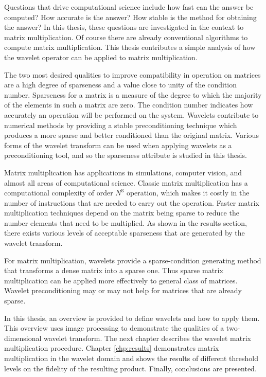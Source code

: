 Questions that drive computational science include how
fast can the answer be computed?  How accurate is the answer?  How
stable is the method for obtaining the answer?  In this thesis, these
questions are investigated in the context to matrix multiplication. Of course there are already
conventional algorithms to compute matrix multiplication. This thesis
contributes a simple analysis of how the wavelet operator can be applied
to matrix multiplication.

The two most desired qualities to improve compatibility in operation on matrices are a high degree of
sparseness and a value close to unity of the condition number. Sparseness for a matrix is a measure of the degree to which %
the majority of the elements in such a matrix are zero.  The
condition number indicates how accurately an operation will be
performed on the system.  Wavelets contribute to numerical methods by
providing a stable preconditioning technique which produces a more
sparse and better conditioned than the original matrix.  Various forms
of the wavelet transform can be used when applying wavelets as a
preconditioning tool, and so the sparseness attribute is studied in this thesis. 

Matrix multiplication has applications in simulations, computer
vision, and almost all areas of computational science.  Classic matrix
multiplication has a computational complexity of order $N^3$
operation, which makes it costly in the number of instructions that
are needed to carry out the operation. Faster matrix multiplication
techniques depend on the matrix being sparse to reduce the number
elements that need to be multiplied.  As shown in the results section,
there exists various levels of acceptable sparseness that are
generated by the wavelet transform.

For matrix multiplication, wavelets provide a sparse-condition generating method
that transforms a dense matrix into a sparse one.  Thus sparse matrix
multiplication can be applied more effectively to general class of
matrices.  Wavelet preconditioning may or may not help for matrices
that are already sparse.

In this thesis, an overview is provided to define wavelets and how to
apply them.  This overview uses image processing to demonstrate the
qualities of a two-dimensional wavelet transform.  The next chapter
describes the wavelet matrix multiplication procedure. Chapter
\ref{chp:results} demonstrates matrix multiplication in the wavelet
domain and shows the results of different threshold levels on the
fidelity of the resulting product.  Finally, conclusions are
presented.

